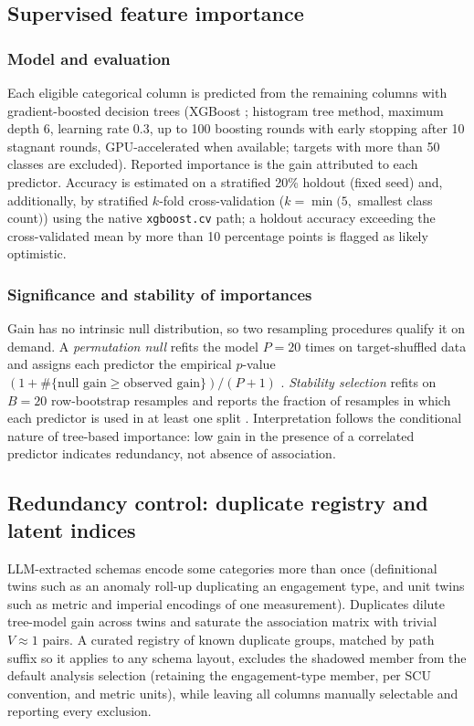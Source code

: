 \documentclass[11pt,a4paper]{article}
\newcommand{\pkg}[1]{\texttt{#1}}
\begin{document}
\subsection{Supervised feature importance}

\subsubsection{Model and evaluation}
Each eligible categorical column is predicted from the remaining columns with
gradient-boosted decision trees (XGBoost \cite{chen2016}; histogram tree method,
maximum depth 6, learning rate 0.3, up to 100 boosting rounds with early stopping after
10 stagnant rounds, GPU-accelerated when available; targets with more than 50 classes
are excluded). Reported importance is the gain attributed to each predictor. Accuracy is
estimated on a stratified 20\% holdout (fixed seed) and, additionally, by stratified
$k$-fold cross-validation ($k = \min(5, $ smallest class count$)$) using the native
\pkg{xgboost.cv} path; a holdout accuracy exceeding the cross-validated mean by more
than 10 percentage points is flagged as likely optimistic.

\subsubsection{Significance and stability of importances}
Gain has no intrinsic null distribution, so two resampling procedures qualify it
on demand. A \emph{permutation null} refits the model $P = 20$ times on
target-shuffled data and assigns each predictor the empirical $p$-value
$(1 + \#\{\text{null gain} \ge \text{observed gain}\})/(P+1)$ \cite{altmann2010}.
\emph{Stability selection} refits on $B = 20$ row-bootstrap resamples and reports the
fraction of resamples in which each predictor is used in at least one split
\cite{meinshausen2010}. Interpretation follows the conditional nature of tree-based
importance: low gain in the presence of a correlated predictor indicates redundancy,
not absence of association.

\subsection{Redundancy control: duplicate registry and latent indices}

LLM-extracted schemas encode some categories more than once (definitional twins such as
an anomaly roll-up duplicating an engagement type, and unit twins such as metric and
imperial encodings of one measurement). Duplicates dilute tree-model gain across twins
and saturate the association matrix with trivial $V \approx 1$ pairs. A curated registry
of known duplicate groups, matched by path suffix so it applies to any schema layout,
excludes the shadowed member from the default analysis selection (retaining the
engagement-type member, per SCU convention, and metric units), while leaving all columns
manually selectable and reporting every exclusion.
\end{document}

